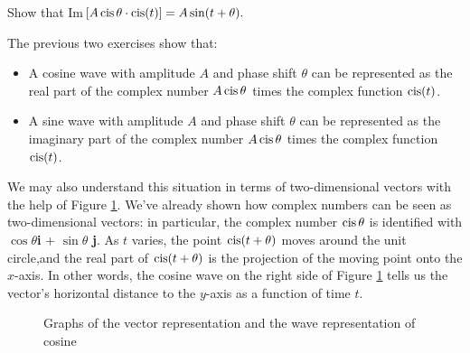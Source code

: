 \begin{exercise}\label{exercise:complex:44}
Show that Im$ [A \operatorname{cis}\theta \cdot \operatorname{cis} (t)] = A \sin (t + \theta). $
\end{exercise}

\noindent
The previous two exercises show that: 

\begin{itemize}
\item
A cosine wave with amplitude $A$ and phase shift $\theta$ can be represented  as the real part of  the complex number $A \operatorname{cis}\theta$ times the complex function $\operatorname{cis}(t)$.
\item
A sine wave with amplitude $A$ and phase shift $\theta$ can be represented  as the imaginary part of  the complex number $A \operatorname{cis}\theta$ times the complex function $\operatorname{cis}(t)$.
\end{itemize}

\noindent
We may also understand this situation in terms of two-dimensional vectors with the help of Figure \ref{fig:complex:3}. We've already shown how complex numbers can be seen as two-dimensional vectors: in particular, the complex number $\operatorname{cis}\theta$ is identified with $\cos\theta$\textbf{i} + $\sin\theta$ \textbf{j}. As $t$ varies, the point $\operatorname{cis}(t+\theta)$ moves around the unit circle,and the real part of $\operatorname{cis}(t + \theta)$ is the projection of the moving point onto the $x$-axis.  In other words, the cosine wave on the right side of Figure \ref{fig:complex:3} tells us the vector's horizontal distance to the $y$-axis as a function of time $t$.

\begin{figure}[htb]
	  \caption{\label{fig:complex:3} Graphs of the vector representation and the wave representation of cosine }
\end{figure}

